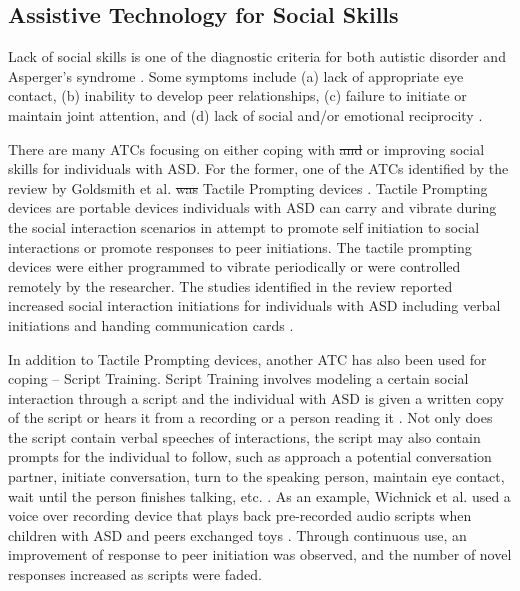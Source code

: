 \documentclass{ut-thesis}
\providecommand{\DIFaddtex}[1]{{\protect\color{blue}\uwave{#1}}} %
\providecommand{\DIFdeltex}[1]{{\protect\color{red}\sout{#1}}}                      %
\providecommand{\DIFaddbegin}{} %
\providecommand{\DIFaddend}{} %
\providecommand{\DIFdelbegin}{} %
\providecommand{\DIFdelend}{} %
\providecommand{\DIFadd}[1]{\texorpdfstring{\DIFaddtex{#1}}{#1}} %
\providecommand{\DIFdel}[1]{\texorpdfstring{\DIFdeltex{#1}}{}} %
\begin{document}
\subsection{Assistive Technology for Social Skills}
Lack of social skills is one of the diagnostic criteria for both autistic disorder and Asperger's syndrome \cite{spitzer1980diagnostic}.  Some symptoms include (a) lack of appropriate eye contact, (b) inability to develop peer relationships, (c) failure to initiate or maintain joint attention, and (d) lack of social and/or emotional reciprocity \cite{rao2008social}.

There are many ATCs focusing on either coping with \DIFdelbegin \DIFdel{and }\DIFdelend \DIFaddbegin \DIFadd{(i.e. teaching is not the primary objective) and/}\DIFaddend or improving social skills for individuals with ASD.  For the former, one of the ATCs identified by the review by Goldsmith et al. \DIFdelbegin \DIFdel{was }\DIFdelend \DIFaddbegin \DIFadd{were }\DIFaddend Tactile Prompting devices \cite{goldsmith2004use}.  Tactile Prompting devices are portable devices individuals with ASD can carry and vibrate during the social interaction scenarios in attempt to promote self initiation to social interactions or promote responses to peer initiations.  The tactile prompting devices were either programmed to vibrate periodically or were controlled remotely by the researcher.  The studies identified in the review reported increased social interaction initiations for individuals with ASD including verbal initiations \cite{shabani2002increasing, taylor1998teaching} and handing communication cards \cite{taylor2004teaching}.

In addition to Tactile Prompting devices, another ATC has also been used for coping -- Script Training.  Script Training involves modeling a certain social interaction through a script and the individual with ASD is given a written copy of the script or hears it from a recording or a person reading it \cite{stevenson2000social}.  Not only does the script contain verbal speeches of interactions, the script may also contain prompts for the individual to follow, such as approach a potential conversation partner, initiate conversation, turn to the speaking person, maintain eye contact, wait until the person finishes talking, etc. \cite{wichnick2010effect}.  As an example, Wichnick et al. used a voice over recording device that plays back pre-recorded audio scripts when children with ASD and peers exchanged toys \cite{wichnick2010effect}.  Through continuous use, an improvement of response to peer initiation was observed, and the number of novel responses increased as scripts were faded.
\end{document}
